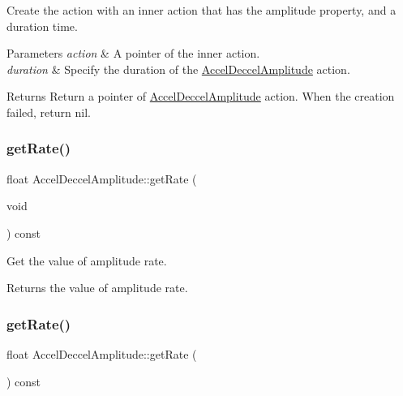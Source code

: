 Create the action with an inner action that has the amplitude property, and a duration time. 


\begin{DoxyParams}{Parameters}
{\em action} & A pointer of the inner action. \\
\hline
{\em duration} & Specify the duration of the \hyperlink{classAccelDeccelAmplitude}{Accel\+Deccel\+Amplitude} action. \\
\hline
\end{DoxyParams}
\begin{DoxyReturn}{Returns}
Return a pointer of \hyperlink{classAccelDeccelAmplitude}{Accel\+Deccel\+Amplitude} action. When the creation failed, return nil. 
\end{DoxyReturn}
\mbox{\label{classAccelDeccelAmplitude_a59e265ad260758bfbea02a391c84bdf7}} 
\subsubsection{\texorpdfstring{get\+Rate()}{getRate()}\hspace{0.1cm}{\footnotesize\ttfamily [1/2]}}
{\footnotesize\ttfamily float Accel\+Deccel\+Amplitude\+::get\+Rate (\begin{DoxyParamCaption}\item[{void}]{ }\end{DoxyParamCaption}) const\hspace{0.3cm}{\ttfamily [inline]}}



Get the value of amplitude rate. 

\begin{DoxyReturn}{Returns}
the value of amplitude rate. 
\end{DoxyReturn}
\mbox{\label{classAccelDeccelAmplitude_a1e9ae0183222ba0d79ed6eb389fae96b}} 
\subsubsection{\texorpdfstring{get\+Rate()}{getRate()}\hspace{0.1cm}{\footnotesize\ttfamily [2/2]}}
{\footnotesize\ttfamily float Accel\+Deccel\+Amplitude\+::get\+Rate (\begin{DoxyParamCaption}{ }\end{DoxyParamCaption}) const\hspace{0.3cm}{\ttfamily [inline]}}



